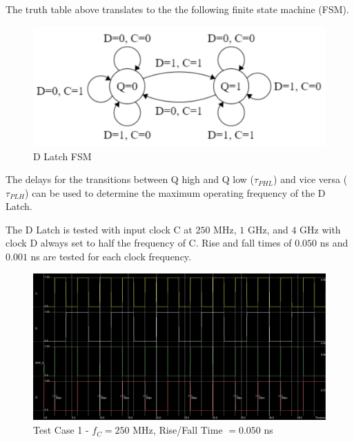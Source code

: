 \FloatBarrier

The truth table above translates to the the following finite state machine (FSM).

\FloatBarrier

\begin{figure}[h!]
	\centering
	\includegraphics[scale=0.70]{../images/dlatch_fsm.PNG}
	\caption{D Latch FSM}
	\label{fig:dlatch_fsm}
\end{figure}

\FloatBarrier

The delays for the transitions between Q high and Q low ($\tau_{PHL}$) and vice versa ($\tau_{PLH}$) can be used to determine the maximum operating frequency of the D Latch.

The D Latch is tested with input clock C at $250$ \si{\mega\hertz}, $1$ \si{\giga\hertz}, and $4$ \si{\giga\hertz} with clock D always set to half the frequency of C.
Rise and fall times of $0.050$ \si{\nano\second} and $0.001$ \si{\nano\second} are tested for each clock frequency.

\FloatBarrier

\begin{figure}[h!]
	\centering
	\includegraphics[scale=0.30]{../images/test_inputs_from_manual.PNG}
	\caption{Test Case 1 - $f_C = 250$ \si{\mega\hertz}, Rise/Fall Time $= 0.050$ \si{\nano\second}}
	\label{fig:layout_test_1}
\end{figure}

